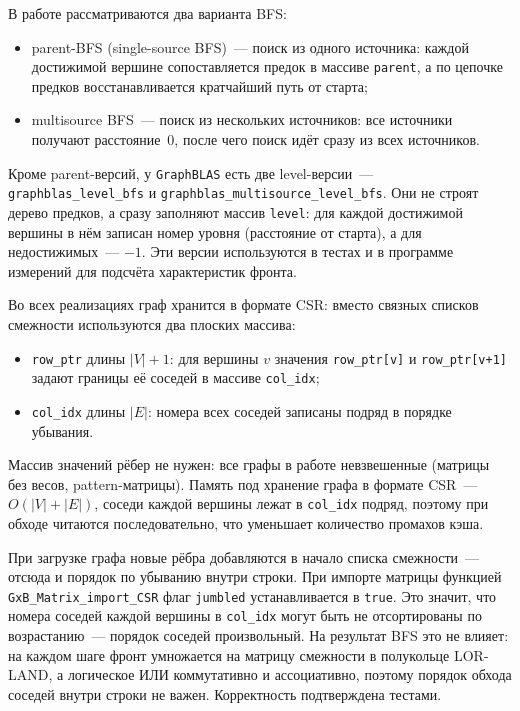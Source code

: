 \documentclass[a4paper]{article}
\begin{document}
В работе рассматриваются два варианта BFS:
\begin{itemize}
    \item parent-BFS (single-source BFS)~--- поиск из одного источника: каждой достижимой вершине сопоставляется предок в массиве \texttt{parent}, а по цепочке предков восстанавливается кратчайший путь от старта;
    \item multisource BFS~--- поиск из нескольких источников: все источники получают расстояние~0, после чего поиск идёт сразу из всех источников.
\end{itemize}

Кроме parent-версий, у \texttt{GraphBLAS} есть две level-версии~--- \texttt{graphblas\_level\_bfs} и \texttt{graphblas\_multisource\_level\_bfs}. Они не строят дерево предков, а сразу заполняют массив \texttt{level}: для каждой достижимой вершины в нём записан номер уровня (расстояние от старта), а для недостижимых~--- $-1$. Эти версии используются в тестах и в программе измерений для подсчёта характеристик фронта.

Во всех реализациях граф хранится в формате CSR: вместо связных списков смежности используются два плоских массива:
\begin{itemize}
    \item \texttt{row\_ptr} длины $|V| + 1$: для вершины $v$ значения \texttt{row\_ptr[v]} и \texttt{row\_ptr[v+1]} задают границы её соседей в массиве \texttt{col\_idx};
    \item \texttt{col\_idx} длины $|E|$: номера всех соседей записаны подряд в порядке убывания.
\end{itemize}

Массив значений рёбер не нужен: все графы в работе невзвешенные (матрицы без весов, pattern-матрицы). Память под хранение графа в формате CSR~--- $O(|V| + |E|)$, соседи каждой вершины лежат в \texttt{col\_idx} подряд, поэтому при обходе читаются последовательно, что уменьшает количество промахов кэша.

При загрузке графа новые рёбра добавляются в начало списка смежности~--- отсюда и порядок по убыванию внутри строки. При импорте матрицы функцией \texttt{GxB\_Matrix\_import\_CSR} флаг \texttt{jumbled} устанавливается в \texttt{true}. Это значит, что номера соседей каждой вершины в \texttt{col\_idx} могут быть не отсортированы по возрастанию~--- порядок соседей произвольный. На результат BFS это не влияет: на каждом шаге фронт умножается на матрицу смежности в полукольце LOR-LAND, а логическое ИЛИ коммутативно и ассоциативно, поэтому порядок обхода соседей внутри строки не важен. Корректность подтверждена тестами.
\end{document}
